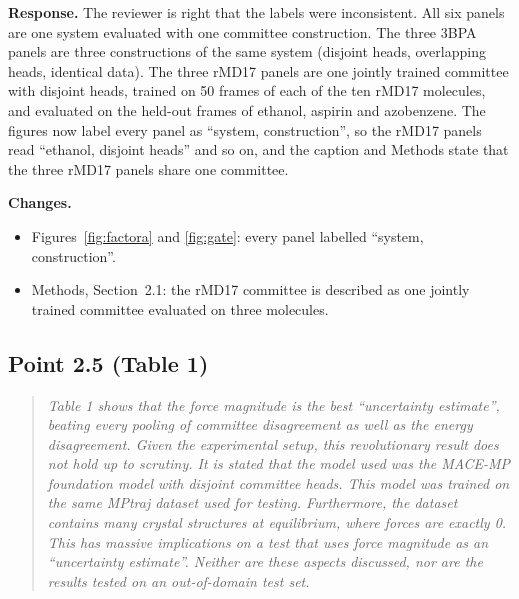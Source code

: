 \documentclass[11pt]{article}
\newcommand{\rpoint}[1]{\begin{quote}\itshape #1\end{quote}}
\newcommand{\response}{\medskip\noindent\textbf{Response.} }
\newcommand{\changes}{\medskip\noindent\textbf{Changes.}}
\begin{document}
\response
The reviewer is right that the labels were inconsistent. All six panels are
one system evaluated with one committee construction. The three 3BPA panels
are three constructions of the same system (disjoint heads, overlapping
heads, identical data). The three rMD17 panels are one jointly trained
committee with disjoint heads, trained on 50 frames of each of the ten rMD17
molecules, and evaluated on the held-out frames of ethanol, aspirin and
azobenzene. The figures now label every panel as ``system, construction'',
so the rMD17 panels read ``ethanol, disjoint heads'' and so on, and the
caption and Methods state that the three rMD17 panels share one committee.

\changes
\begin{itemize}
\item Figures~\ref{fig:factora} and \ref{fig:gate}: every panel labelled
  ``system, construction''.
\item Methods, Section~2.1: the rMD17 committee is described as one jointly
  trained committee evaluated on three molecules.
\end{itemize}

\subsection*{Point 2.5 (Table 1)}
\rpoint{Table 1 shows that the force magnitude is the best ``uncertainty
estimate'', beating every pooling of committee disagreement as well as the
energy disagreement. Given the experimental setup, this revolutionary result
does not hold up to scrutiny. It is stated that the model used was the
MACE-MP foundation model with disjoint committee heads. This model was trained
on the same MPtraj dataset used for testing. Furthermore, the dataset contains
many crystal structures at equilibrium, where forces are exactly 0. This has
massive implications on a test that uses force magnitude as an ``uncertainty
estimate''. Neither are these aspects discussed, nor are the results tested
on an out-of-domain test set.}
\end{document}
